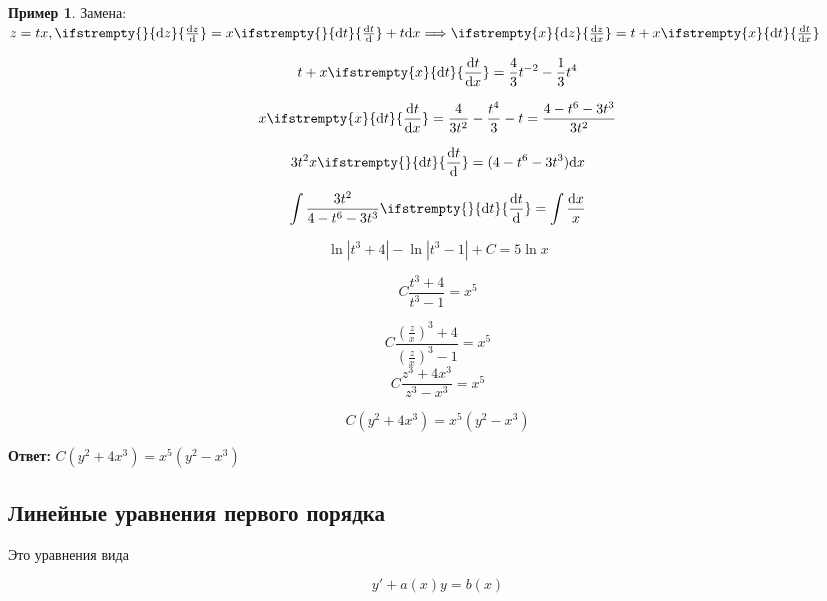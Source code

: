 \documentclass[a4paper, 14pt]{article}
\newcommand{\dx}{\mathrm{d}x}
\newcommand{\dv}[2]{%
  \ifstrempty{#2}%
    {\mathrm{d}#1}%
    {\frac{\mathrm{d}#1}{\mathrm{d}#2}}%
}
\theoremstyle{definition}
\newtheorem*{example}{Пример}
\newenvironment{answer}
  {\par\noindent\textbf{Ответ:}}
  {\par}
\begin{document}
\begin{itemize}
\begin{example}
    Замена: \, $z=tx, \dv{z}{} = x\dv{t}{} + t\dx \Longrightarrow \dv{z}{x} = t + x\dv{t}{x}$

    \[t + x\dv{t}{x} = \frac{4}{3}t^{-2} - \frac{1}{3}t^4\]

    \[x\dv{t}{x} = \frac{4}{3t^2} - \frac{t^4}{3} - t = \frac{4-t^6-3t^3}{3t^2}\]

    \[3t^2x\dv{t}{} = (4-t^6-3t^3)\dx\]

    \[\int\frac{3t^2}{4-t^6-3t^3}\dv{t}{} = \int\frac{\dx}{x}\]

    \[\ln{|t^3+4|} - \ln{|t^3-1|} + C = 5\ln{x}\]

    \[C\frac{t^3+4}{t^3-1} = x^5\]

    \[C\frac{\left(\frac{z}{x}\right)^3+4}{\left(\frac{z}{x}\right)^3-1} = x^5\]
    \[C\frac{z^3+4x^3}{z^3-x^3} = x^5\]

    \[C(y^2+4x^3) = x^5(y^2-x^3)\]

\end{example}
\begin{answer}
    $C(y^2+4x^3) = x^5(y^2-x^3)$
\end{answer}


 
\end{itemize}
\newpage
\subsection{Линейные уравнения первого порядка}

Это уравнения вида

\[y' + a(x)y = b(x)\]
\end{document}
